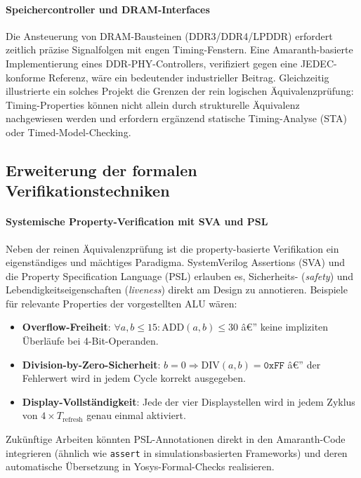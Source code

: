 ﻿\documentclass[12pt,a4paper]{report}
\begin{document}
\paragraph{Speichercontroller und DRAM-Interfaces}
Die Ansteuerung von DRAM-Bausteinen (DDR3/DDR4/LPDDR) erfordert zeitlich präzise
Signalfolgen mit engen Timing-Fenstern. Eine Amaranth-basierte Implementierung eines
DDR-PHY-Controllers, verifiziert gegen eine JEDEC-konforme Referenz, wäre ein
bedeutender industrieller Beitrag. Gleichzeitig illustrierte ein solches Projekt die
Grenzen der rein logischen Äquivalenzprüfung: Timing-Properties können nicht allein durch
strukturelle Äquivalenz nachgewiesen werden und erfordern ergänzend statische
Timing-Analyse (STA) oder Timed-Model-Checking.

\subsection{Erweiterung der formalen Verifikationstechniken}

\paragraph{Systemische Property-Verification mit SVA und PSL}
Neben der reinen Äquivalenz\-prüfung ist die property-basierte Verifikation ein
eigenständiges und mächtiges Paradigma. SystemVerilog Assertions (SVA) und die
Property Specification Language (PSL) erlauben es, Sicherheits- (\textit{safety}) und
Lebendigkeitseigenschaften (\textit{liveness}) direkt am Design zu annotieren. Beispiele
für relevante Properties der vorgestellten ALU wären:

\begin{itemize}
  \item \textbf{Overflow-Freiheit}: $\forall a, b \leq 15 : \text{ADD}(a, b) \leq 30$
        â€” keine impliziten Überläufe bei 4-Bit-Operanden.
  \item \textbf{Division-by-Zero-Sicherheit}: $b = 0 \Rightarrow \text{DIV}(a, b) = \texttt{0xFF}$
        â€” der Fehlerwert wird in jedem Cycle korrekt ausgegeben.
  \item \textbf{Display-Vollständigkeit}: Jede der vier Displaystellen wird in jedem
        Zyklus von $4 \times T_{\mathrm{refresh}}$ genau einmal aktiviert.
\end{itemize}

Zukünftige Arbeiten könnten PSL-Annotationen direkt in den Amaranth-Code integrieren
(ähnlich wie \texttt{assert} in simulationsbasierten Frameworks) und deren automatische
Übersetzung in Yosys-Formal-Checks realisieren.
\end{document}
